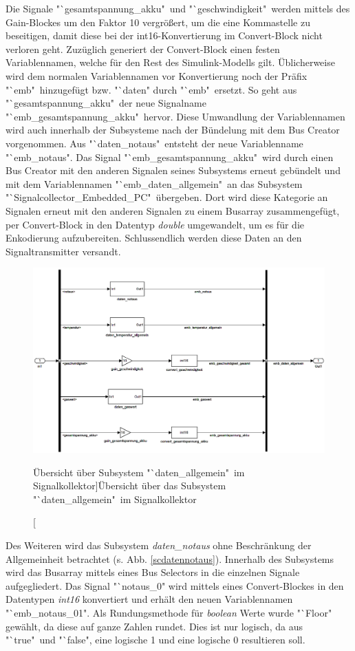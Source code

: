 \documentclass[fontsize = 12pt, paper = a4]{scrreprt}
\begin{document}
Die Signale "`gesamtspannung\_akku"\ und "`geschwindigkeit"\ werden mittels des Gain-Blockes um den Faktor 10 vergrößert, um die eine Kommastelle zu beseitigen, damit diese bei der int16-Konvertierung im Convert-Block nicht verloren geht. Zuzüglich generiert der Convert-Block einen festen Variablennamen, welche für den Rest des Simulink-Modells gilt. Üblicherweise wird dem normalen Variablennamen vor Konvertierung noch der Präfix "`emb"\ hinzugefügt bzw. "`daten" durch "`emb"\ ersetzt. So geht aus "`gesamtspannung\_akku"\ der neue Signalname "`emb\_gesamtspannung\_akku"\ hervor. Diese Umwandlung der Variablennamen wird auch innerhalb der Subsysteme nach der Bündelung mit dem Bus Creator vorgenommen. Aus "`daten\_notaus"\ entsteht der neue Variablenname "`emb\_notaus". Das Signal "`emb\_gesamtspannung\_akku"\ wird durch einen Bus Creator mit den anderen Signalen seines Subsystems erneut gebündelt und mit dem Variablennamen "`emb\_daten\_allgemein"\ an das Subsystem "`Signalcollector\_Embedded\_PC"\ übergeben. Dort wird diese Kategorie an Signalen erneut mit den anderen Signalen zu einem Busarray zusammengefügt, per Convert-Block in den Datentyp \textit{double} umgewandelt, um es für die Enkodierung aufzubereiten. Schlussendlich werden diese Daten an den Signaltransmitter versandt. 

\begin{figure}[h]
\centering
\includegraphics[scale = 0.37]{sc_daten_allgemein}
\caption[Übersicht über Subsystem "`daten\_allgemein"\ im Signalkollektor]{Übersicht über das Subsystem "`daten\_allgemein"\ im Signalkollektor}
\label{scdatenallgemein}
\end{figure}

Des Weiteren wird das Subsystem \textit{daten\_notaus} ohne Beschränkung der Allgemeinheit betrachtet (s. Abb. \ref{scdatennotaus}). Innerhalb des Subsystems wird das Busarray mittels eines Bus Selectors in die einzelnen Signale aufgegliedert. Das Signal "`notaus\_0" wird mittels eines Convert-Blockes in den Datentypen \textit{int16} konvertiert und erhält den neuen Variablennamen "`emb\_notaus\_01". Als Rundungsmethode für \textit{boolean} Werte wurde "`Floor" gewählt, da diese auf ganze Zahlen rundet. Dies ist nur logisch, da aus "`true"\ und "`false", eine logische 1 und eine logische 0 resultieren soll.
\end{document}
